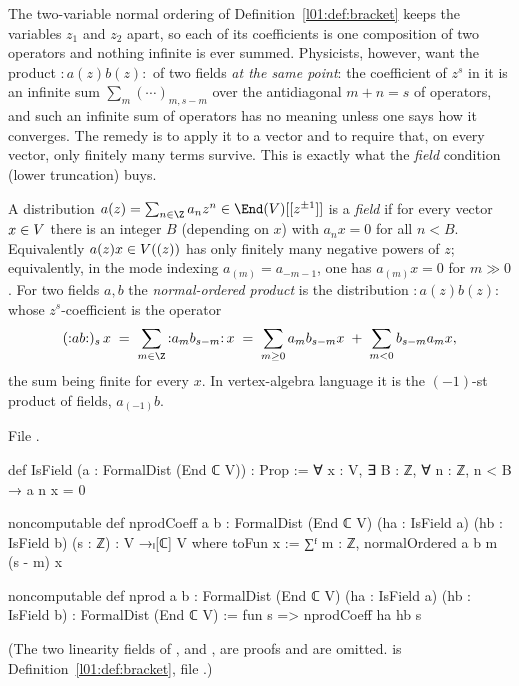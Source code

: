 The two-variable normal ordering of Definition~\ref{l01:def:bracket} keeps the variables $z_1$ and $z_2$
apart, so each of its coefficients is one composition of two operators and nothing infinite is ever summed.
Physicists, however, want the product ${:}a(z)b(z){:}$ of two fields \emph{at the same point}: the coefficient of
$z^s$ in it is an infinite sum $\sum_m(\cdots)_{m,s-m}$ over the antidiagonal $m+n=s$ of operators, and such an
infinite sum of operators has no meaning unless one says how it converges. The remedy is to apply it to a vector
and to require that, on every vector, only finitely many terms survive. This is exactly what the \emph{field}
condition (lower truncation) buys.

\begin{definition}\label{l01:def:field}
A distribution $a(z) = \sum_{n\in\Z}a_nz^n\in\End(\loneV)[[z^{\pm1}]]$ is a \emph{field} if for every vector
$x\in V$ there is an integer $B$ (depending on $x$) with $a_nx = 0$ for all $n<B$. Equivalently
$a(z)x\in V((z))$ has only finitely many negative powers of $z$; equivalently, in the mode indexing
$a_{(m)} = a_{-m-1}$, one has $a_{(m)}x = 0$ for $m\gg0$.
For two fields $a,b$ the \emph{normal-ordered product} is the distribution ${:}a(z)b(z){:}$ whose $z^s$-coefficient
is the operator
\begin{equation*}
 ({:}ab{:})_s\,x \;=\; \sum_{m\in\Z}{:}a_mb_{s-m}{:}\,x
 \;=\; \sum_{m\ge0}a_mb_{s-m}x \;+\; \sum_{m<0}b_{s-m}a_mx ,
\end{equation*}
the sum being finite for every $x$. In vertex-algebra language it is the $(-1)$-st product of fields,
$a_{(-1)}b$.
\end{definition}

\noindent File .
\begin{leancode}
def IsField (a : FormalDist (End ℂ V)) : Prop :=
  ∀ x : V, ∃ B : ℤ, ∀ n : ℤ, n < B → a n x = 0

noncomputable def nprodCoeff {a b : FormalDist (End ℂ V)}
    (ha : IsField a) (hb : IsField b) (s : ℤ) : V →ₗ[ℂ] V where
  toFun x := ∑ᶠ m : ℤ, normalOrdered a b m (s - m) x

noncomputable def nprod {a b : FormalDist (End ℂ V)}
    (ha : IsField a) (hb : IsField b) : FormalDist (End ℂ V) :=
  fun s => nprodCoeff ha hb s
\end{leancode}
(The two linearity fields of ,  and , are proofs and are omitted.
 is Definition~\ref{l01:def:bracket}, file .)

